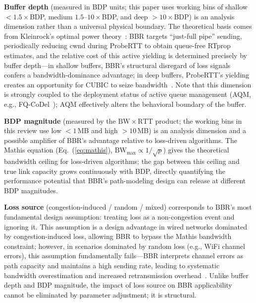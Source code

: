 \documentclass[a4paper,fleqn]{cas-sc}
\begin{document}
\textbf{Buffer depth} (measured in BDP units; this paper uses working bins of
shallow $<1.5\times$BDP, medium $1.5$--$10\times$BDP, and deep $>10\times$BDP)
is an analysis dimension rather than a universal physical boundary. The theoretical
basis comes from Kleinrock's optimal power theory~\citep{kleinrock1979power}: BBR
targets ``just-full pipe'' sending, periodically reducing cwnd during ProbeRTT to
obtain queue-free RTprop estimates, and the relative cost of this active
yielding is determined precisely by buffer depth---in shallow buffers, BBR's
structural disregard of loss signals confers a bandwidth-dominance advantage; in
deep buffers, ProbeRTT's yielding creates an opportunity for CUBIC to
seize bandwidth~\citep{appenzeller2004sizing,dhamdhere2006buffer,wischik2005buffers}.
Note that this dimension is strongly coupled to the deployment status of active
queue management (AQM, e.g., FQ-CoDel~\citep{hoeiland2018fq}); AQM effectively
alters the behavioral boundary of the buffer.

\textbf{BDP magnitude} (measured by the $\mathrm{BW}\times\mathrm{RTT}$ product;
the working bins in this review use low $<1$\,MB and high $>10$\,MB) is an
analysis dimension and a possible amplifier of
BBR's advantage relative to loss-driven algorithms. The Mathis equation
(Eq.~(\ref{eq:mathis}), $\mathrm{BW}_{\max}\propto 1/\sqrt{p}$) gives the
theoretical bandwidth ceiling for loss-driven algorithms; the gap between this
ceiling and true link capacity grows continuously with BDP, directly quantifying
the performance potential that BBR's path-modeling design can release at different
BDP magnitudes.

\textbf{Loss source} (congestion-induced / random / mixed) corresponds to BBR's
most fundamental design assumption: treating loss as a non-congestion event and
ignoring it. This assumption is a design advantage in wired networks dominated by
congestion-induced loss, allowing BBR to bypass the Mathis bandwidth constraint;
however, in scenarios dominated by random loss (e.g., WiFi channel errors), this
assumption fundamentally fails---BBR interprets channel errors as path capacity
and maintains a high sending rate, leading to systematic bandwidth overestimation
and increased retransmission overhead~\citep{grazia2020bbrp}. Unlike buffer depth
and BDP magnitude, the impact of loss source on BBR applicability cannot be
eliminated by parameter adjustment; it is structural.
\end{document}

